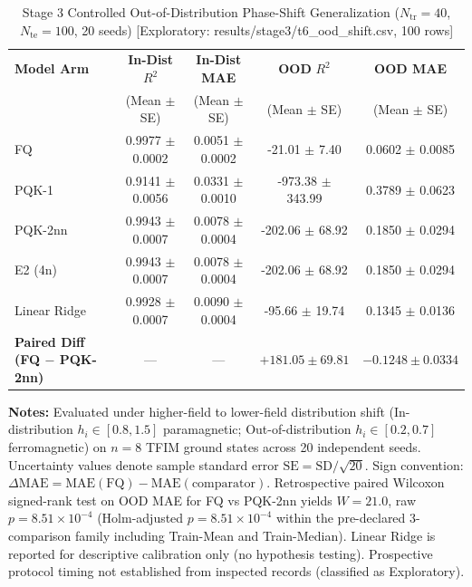 \begin{table}[!t]
\caption{Stage 3 Controlled Out-of-Distribution Phase-Shift Generalization ($N_{\mathrm{tr}}=40$, $N_{\mathrm{te}}=100$, 20 seeds) [Exploratory: results/stage3/t6_ood_shift.csv, 100 rows]}
\label{tab:ood}
\centering
\begingroup
\small
\setlength{\tabcolsep}{5pt}
\begin{tabular}{@{}lcccc@{}}
\toprule
\textbf{Model Arm} & \textbf{In-Dist} $R^2$ & \textbf{In-Dist MAE} & \textbf{OOD} $R^2$ & \textbf{OOD MAE} \\
 & (Mean $\pm$ SE) & (Mean $\pm$ SE) & (Mean $\pm$ SE) & (Mean $\pm$ SE) \\
\midrule
FQ & 0.9977 $\pm$ 0.0002 & 0.0051 $\pm$ 0.0002 & -21.01 $\pm$ 7.40 & 0.0602 $\pm$ 0.0085 \\
PQK-1 & 0.9141 $\pm$ 0.0056 & 0.0331 $\pm$ 0.0010 & -973.38 $\pm$ 343.99 & 0.3789 $\pm$ 0.0623 \\
PQK-2nn & 0.9943 $\pm$ 0.0007 & 0.0078 $\pm$ 0.0004 & -202.06 $\pm$ 68.92 & 0.1850 $\pm$ 0.0294 \\
E2 (4n) & 0.9943 $\pm$ 0.0007 & 0.0078 $\pm$ 0.0004 & -202.06 $\pm$ 68.92 & 0.1850 $\pm$ 0.0294 \\
Linear Ridge & 0.9928 $\pm$ 0.0007 & 0.0090 $\pm$ 0.0004 & -95.66 $\pm$ 19.74 & 0.1345 $\pm$ 0.0136 \\
\midrule
\textbf{Paired Diff (FQ $-$ PQK-2nn)} & --- & --- & $+181.05 \pm 69.81$ & $-0.1248 \pm 0.0334$ \\
\bottomrule
\end{tabular}
\endgroup
\vspace{1ex}
{\raggedright \footnotesize \textbf{Notes:} Evaluated under higher-field to lower-field distribution shift (In-distribution $h_i \in [0.8, 1.5]$ paramagnetic; Out-of-distribution $h_i \in [0.2, 0.7]$ ferromagnetic) on $n=8$ TFIM ground states across 20 independent seeds. Uncertainty values denote sample standard error $\mathrm{SE} = \mathrm{SD}/\sqrt{20}$. Sign convention: $\Delta\mathrm{MAE} = \mathrm{MAE}(\mathrm{FQ}) - \mathrm{MAE}(\mathrm{comparator})$. Retrospective paired Wilcoxon signed-rank test on OOD MAE for FQ vs PQK-2nn yields $W=21.0$, raw $p=8.51\times 10^{-4}$ (Holm-adjusted $p=8.51\times 10^{-4}$ within the pre-declared 3-comparison family including Train-Mean and Train-Median). Linear Ridge is reported for descriptive calibration only (no hypothesis testing). Prospective protocol timing not established from inspected records (classified as Exploratory).\par}
\end{table}
